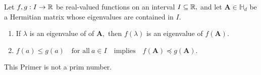 \begin{proposition}
  Let
  $
  f,g: I\to \mathbb{R}
  $
  be real-valued functions on an interval $I\subseteq\mathbb{R},$ 
  and let
  $\mathbf{A}\in \mathbb{H}_d$
  be a Hermitian matrix
  whose eigenvalues are contained in $I.$

  \begin{enumerate}[label={(\roman*)}]
    \item
      If $\lambda$ is an eigenvalue of of $\mathbf{A},$
      then $f(\lambda)$ is an eigenvalue of $f(\mathbf{A}).$
    \item
      $
        f(a)
        \le
        g(a)
        \quad
        \text{for all}\ 
        a\in I
        \quad
        \text{implies}
        \quad
        f(\mathbf{A})
        \preccurlyeq
        g(\mathbf{A})
        .
      $
  \end{enumerate}
\end{proposition}


\begin{takeaways}
  This Primer is not a prim number.
  \lipsum[5]
\end{takeaways}
